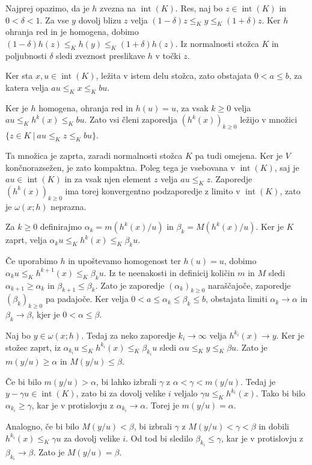 \documentclass[mat2, tisk]{fmfdelo}
\begin{document}
\begin{dokaz}
  Najprej opazimo, da je $h$ zvezna na $\operatorname{int}(K)$.
  Res, naj bo $z\in\operatorname{int}(K)$ in $0<\delta<1$.
  Za vse $y$ dovolj blizu $z$ velja
  $(1-\delta)z\leq_K y\leq_K(1+\delta)z$.
  Ker $h$ ohranja red in je homogena, dobimo
  $(1-\delta)h(z)\leq_K h(y)\leq_K(1+\delta)h(z)$.
  Iz normalnosti stožca $K$ in poljubnosti $\delta$
  sledi zveznost preslikave $h$ v točki $z$.

  Ker sta $x,u\in\operatorname{int}(K)$, ležita v istem delu stožca,
  zato obstajata $0<a\leq b$, za katera velja
  $au\leq_Kx\leq_Kbu$.

  Ker je $h$ homogena, ohranja red in $h(u)=u$, za vsak $k\geq0$ velja
  $au\leq_Kh^k(x)\leq_Kbu$. Zato vsi členi zaporedja
  $(h^k(x))_{k\geq0}$ ležijo v množici
  $\{z\in K ~|~ au\leq_K z\leq_K bu\}$.

  Ta množica je zaprta, zaradi normalnosti stožca $K$ pa tudi omejena.
  Ker je $V$ končnorazsežen, je zato kompaktna. Poleg tega je
  vsebovana v $\operatorname{int}(K)$, saj je
  $au\in\operatorname{int}(K)$ in za vsak njen element $z$
  velja $au\leq_K z$. Zaporedje $(h^k(x))_{k\geq0}$
  ima torej konvergentno podzaporedje z limito v
  $\operatorname{int}(K)$, zato je $\omega(x;h)$ neprazna.

  Za $k\geq0$ definirajmo
  $\alpha_k=m(h^k(x)/u)$ in $\beta_k=M(h^k(x)/u)$. Ker je $K$ zaprt,
  velja
  $\alpha_ku\leq_Kh^k(x)\leq_K\beta_ku$.

  Če uporabimo $h$ in upoštevamo homogenost ter $h(u)=u$, dobimo
  $\alpha_ku\leq_Kh^{k+1}(x)\leq_K\beta_ku$. Iz te neenakosti
  in definicij količin $m$ in $M$ sledi
  $\alpha_{k+1}\geq\alpha_k$ in
  $\beta_{k+1}\leq\beta_k$.
  Zato je zaporedje $(\alpha_k)_{k\geq0}$ naraščajoče, zaporedje
  $(\beta_k)_{k\geq0}$ pa padajoče.
  Ker velja $0<a\leq\alpha_k\leq\beta_k\leq b$, obstajata limiti
  $\alpha_k\longrightarrow\alpha$ in
  $\beta_k\longrightarrow\beta$, kjer je $0<\alpha\leq\beta$.

  Naj bo $y\in\omega(x;h)$. Tedaj za neko zaporedje
  $k_i\longrightarrow\infty$ velja
  $h^{k_i}(x)\longrightarrow y$. Ker je stožec zaprt, iz
  $\alpha_{k_i}u\leq_Kh^{k_i}(x)\leq_K\beta_{k_i}u$ sledi
  $\alpha u\leq_Ky\leq_K\beta u$. Zato je
  $m(y/u)\geq\alpha$ in $M(y/u)\leq\beta$.

  Če bi bilo $m(y/u)>\alpha$, bi lahko izbrali
  $\gamma$ z $\alpha<\gamma<m(y/u)$. Tedaj je
  $y-\gamma u\in\operatorname{int}(K)$, zato bi za dovolj velike $i$
  veljalo $\gamma u\leq_Kh^{k_i}(x)$. Tako bi bilo
  $\alpha_{k_i}\geq\gamma$, kar je v protislovju z
  $\alpha_{k_i}\longrightarrow\alpha$. Torej je $m(y/u)=\alpha$.

  Analogno, če bi bilo $M(y/u)<\beta$, bi izbrali
  $\gamma$ z $M(y/u)<\gamma<\beta$ in dobili
  $h^{k_i}(x)\leq_K\gamma u$ za dovolj velike $i$. Od tod bi sledilo
  $\beta_{k_i}\leq\gamma$, kar je v protislovju z
  $\beta_{k_i}\longrightarrow\beta$. Zato je $M(y/u)=\beta$.
\end{dokaz}
\end{document}
